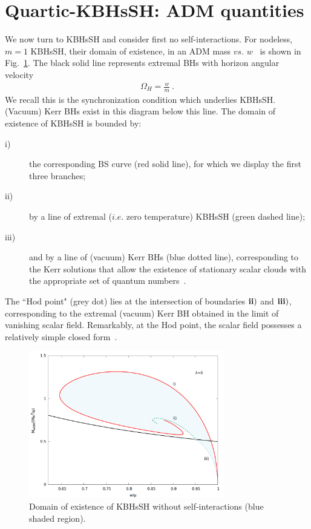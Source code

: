 \section{Quartic-KBHsSH: ADM quantities}
\label{sec_III}
We now turn to KBHsSH and consider first no self-interactions. For nodeless, $m=1$ KBHsSH, their domain of existence, in an ADM mass $vs.$ $w$~\cite{Herdeiro:2014goa,Herdeiro:2015gia} is shown in Fig.~\ref{kbhsh0}.  The black solid line represents extremal BHs {with horizon angular velocity}
\begin{eqnarray}
\label{cond}
 \Omega_H=\frac{w}{m} \ .
\end{eqnarray} 
We recall this is the synchronization condition which underlies KBHsSH. (Vacuum) Kerr BHs exist in this diagram below this line. The domain of existence of KBHsSH is bounded by:
\begin{description}
\item[i)] the corresponding BS curve (red solid line), for which we display the first three branches;
\item[ii)] by a line of extremal ($i.e.$ zero temperature) KBHsSH (green dashed line);
\item[iii)] and by a line of (vacuum) Kerr BHs (blue dotted line), corresponding to the Kerr solutions that allow the existence of stationary scalar clouds with the appropriate set of quantum numbers~\cite{Herdeiro:2014goa,Benone:2014ssa}.   
\end{description}
The ``Hod point" (grey dot) lies at the intersection of boundaries ${\bf ii)}$ and ${\bf iii)}$, corresponding to the extremal (vacuum) Kerr BH obtained in the limit of vanishing scalar field. Remarkably,  at the Hod point, the scalar field possesses a relatively simple closed form~\cite{Hod:2012px}.



\begin{figure}[h!]
  \begin{center}
     \includegraphics[width=8.55cm]{papers/selfInteractions/w-vs-M-0.png}
      \end{center}
  \caption{Domain of existence of KBHsSH without self-interactions (blue shaded region).}
  \label{kbhsh0}
\end{figure}




